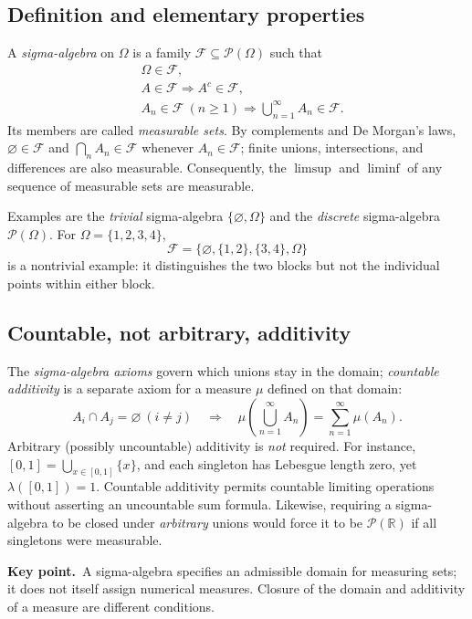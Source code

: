 \documentclass[10pt,a4paper]{article}
\newcommand{\R}{\mathbb R}
\newcommand{\PO}{\mathcal P(\Omega)}
\newcommand{\key}[1]{\par\smallskip\textcolor{accent}{\textbf{Key point.}}\ #1\par}
\begin{document}
\subsection{Definition and elementary properties}
A \emph{sigma-algebra} on $\Omega$ is a family $\mathcal F\subseteq\PO$ such that
\[
\boxed{\begin{aligned}
&\Omega\in\mathcal F,\\
&A\in\mathcal F\Longrightarrow A^c\in\mathcal F,\\
&A_n\in\mathcal F\ (n\ge1)\Longrightarrow\bigcup_{n=1}^{\infty}A_n\in\mathcal F.
\end{aligned}}
\]
Its members are called \emph{measurable sets}. By complements and De Morgan's
laws, $\varnothing\in\mathcal F$ and $\bigcap_n A_n\in\mathcal F$ whenever
$A_n\in\mathcal F$; finite unions, intersections, and differences are also measurable.
Consequently, the $\limsup$ and $\liminf$ of any sequence of measurable sets
are measurable.

Examples are the \emph{trivial} sigma-algebra $\{\varnothing,\Omega\}$ and the
\emph{discrete} sigma-algebra $\PO$. For $\Omega=\{1,2,3,4\}$,
\[
\mathcal F=\{\varnothing,\{1,2\},\{3,4\},\Omega\}
\]
is a nontrivial example: it distinguishes the two blocks but not the individual
points within either block.

\subsection{Countable, not arbitrary, additivity}
The \emph{sigma-algebra axioms} govern which unions stay in the domain;
\emph{countable additivity} is a separate axiom for a measure $\mu$ defined on
that domain:
\[
\boxed{A_i\cap A_j=\varnothing\ (i\ne j)
\quad\Longrightarrow\quad
\mu\!\left(\bigcup_{n=1}^{\infty}A_n\right)
=\sum_{n=1}^{\infty}\mu(A_n).}
\]
Arbitrary (possibly uncountable) additivity is \emph{not} required. For instance,
$[0,1]=\bigcup_{x\in[0,1]}\{x\}$, and each singleton has Lebesgue length zero,
yet $\lambda([0,1])=1$. Countable additivity permits countable limiting
operations without asserting an uncountable sum formula. Likewise, requiring
a sigma-algebra to be closed under \emph{arbitrary} unions would force it to be
$\mathcal P(\R)$ if all singletons were measurable.

\key{A sigma-algebra specifies an admissible domain for measuring sets; it does not itself assign numerical measures. Closure of the domain and additivity of a measure are different conditions.}
\end{document}
